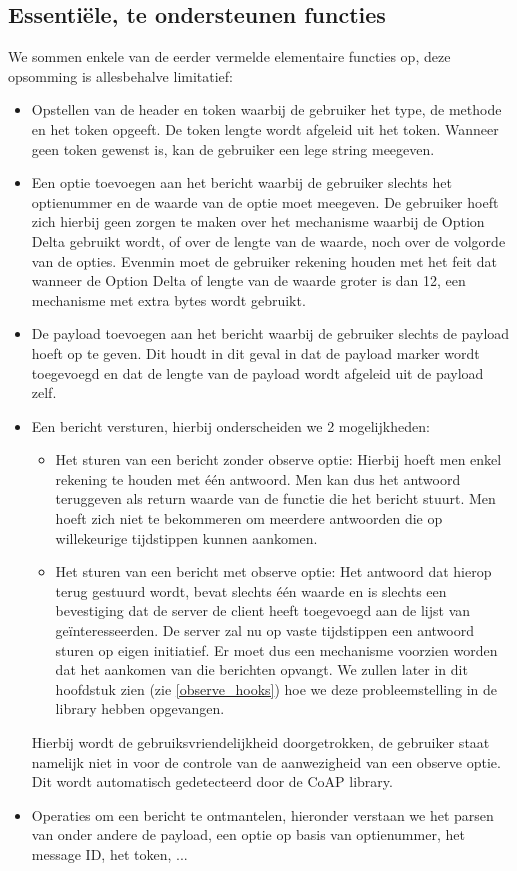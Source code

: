 \subsection{Essenti\"{e}le, te ondersteunen functies} \label{essentielefuncties}

We sommen enkele van de eerder vermelde elementaire functies op, deze opsomming is allesbehalve limitatief:

\begin{itemize}
\item Opstellen van de header en token waarbij de gebruiker het type, de methode en het token opgeeft. De token lengte wordt afgeleid uit het token. Wanneer geen token gewenst is, kan de gebruiker een lege string meegeven.
\item Een optie toevoegen aan het bericht waarbij de gebruiker slechts het optienummer en de waarde van de optie moet meegeven. De gebruiker hoeft zich hierbij geen zorgen te maken over het mechanisme waarbij de Option Delta gebruikt wordt, of over de lengte van de waarde, noch over de volgorde van de opties. Evenmin moet de gebruiker rekening houden met het feit dat wanneer de Option Delta of lengte van de waarde groter is dan 12, een mechanisme met extra bytes wordt gebruikt.
\item De payload toevoegen aan het bericht waarbij de gebruiker slechts de payload hoeft op te geven.  Dit houdt in dit geval in dat de payload marker wordt toegevoegd en dat de lengte van de payload wordt afgeleid uit de payload zelf.
\item Een bericht versturen, hierbij onderscheiden we 2 mogelijkheden:
\begin{itemize}
\item Het sturen van een bericht zonder observe optie: Hierbij hoeft men enkel rekening te houden met \'{e}\'{e}n antwoord. Men kan dus het antwoord teruggeven als return waarde van de functie die het bericht stuurt. Men hoeft zich niet te bekommeren om meerdere antwoorden die op willekeurige tijdstippen kunnen aankomen.
\item Het sturen van een bericht met observe optie: Het antwoord dat hierop terug gestuurd wordt, bevat slechts \'{e}\'{e}n waarde en is slechts een bevestiging dat de server de client heeft toegevoegd aan de lijst van ge\"{i}nteresseerden. De server zal nu op vaste tijdstippen een antwoord sturen op eigen initiatief. Er moet dus een mechanisme voorzien worden dat het aankomen van die berichten opvangt. We zullen later in dit hoofdstuk zien (zie \ref{observe_hooks}) hoe we deze probleemstelling in de library hebben opgevangen.
\end{itemize}
Hierbij wordt de gebruiksvriendelijkheid doorgetrokken, de gebruiker staat namelijk niet in voor de controle van de aanwezigheid van een observe optie. Dit wordt automatisch gedetecteerd door de CoAP library.
\item Operaties om een bericht te ontmantelen, hieronder verstaan we het parsen van onder andere de payload, een optie op basis van optienummer, het message ID, het token, ...
\end{itemize}

